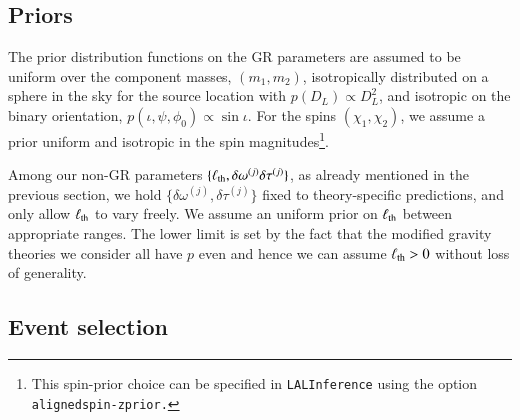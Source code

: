 \documentclass[twocolumn,
               prd,
               aps,
               superscriptaddress,
               tightenlines,
               nofootinbib,
               eqsecnum,
               amsfonts,
               amsmath,
               longbibliography]{revtex4-1}
\begin{document}
\subsection{Priors}

The prior distribution functions on the GR parameters are assumed to be
uniform over the component masses, $(m_1, m_2)$, isotropically distributed on a
sphere in the sky for the source location with $p(D_L) \propto D_L^2$, and isotropic
on the binary orientation, $p(\iota, \psi, \phi_0) \propto \sin\iota$. For the spins
$(\chi_1, \chi_2)$, we assume a prior uniform and isotropic in the spin magnitudes\footnote{This spin-prior choice can be specified in \texttt{LALInference} using the option \texttt{alignedspin-zprior.}}.
%

Among our non-GR parameters $\{\ell_{\rm th}, \delta \omega^{(j)}\delta \tau^{(j)}\}$,
as already mentioned in the previous section, we hold $\{\delta \omega^{(j)},\delta \tau^{(j)}\}$
fixed to theory-specific predictions, and only allow $\ell_{\rm th}$ to vary freely.
%
We assume an uniform prior on $\ell_{\rm th}$ between appropriate ranges.
%
The lower limit is set by the fact that the modified gravity theories we consider
all have $p$ even and hence we can assume $\ell_{\rm th} > 0$ without loss of
generality.
%


\subsection{Event selection}
\end{document}
